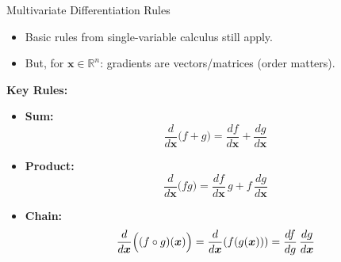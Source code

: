 \documentclass[11pt,compress,t,notes=noshow, xcolor=table]{beamer}
\newcommand{\deriv}{d}
\begin{document}
\begin{vbframe}{Multivariate Differentiation Rules}
  \begin{itemize}
    \item Basic rules from single-variable calculus still apply.
    \item But, for \(\boldsymbol{x}\in\mathbb{R}^{n}\): gradients are vectors/matrices (order matters).
  \end{itemize}
  
  \vspace{1em}
  \textbf{Key Rules:}\\
  
  \begin{itemize}
      \item \textbf{Sum:} 
      \[
      \frac{\deriv}{\deriv \boldsymbol{x}}\bigl(f+g\bigr)=\frac{\deriv f}{\deriv \boldsymbol{x}}+\frac{\deriv g}{\deriv \boldsymbol{x}}
      \]
    \item \textbf{Product:} 
      \[
      \frac{\deriv}{\deriv \boldsymbol{x}}\bigl(fg\bigr)=\frac{\deriv f}{\deriv \boldsymbol{x}}\,g+f\,\frac{\deriv g}{\deriv \boldsymbol{x}}
      \]
    \item \textbf{Chain:} 
      \[
      \frac{\deriv}{\deriv \boldsymbol{x}}\Bigl((f\circ g)(\boldsymbol{x})\Bigr)=\dfrac{\deriv}{\deriv \boldsymbol{x}}(f(g(\boldsymbol{x})))=\frac{\deriv f}{\deriv g}\,\frac{\deriv g}{\deriv \boldsymbol{x}}
      \]
  \end{itemize}
\end{vbframe}
\end{document}
